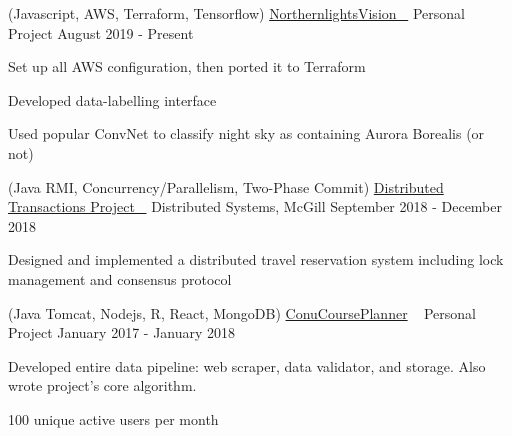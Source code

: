 


\begin{cventries}


\cventry
{(Javascript, AWS, Terraform, Tensorflow)} %
{\href{https://github.com/stumash/northern-lights-vision}{NorthernlightsVision \ \faGithubSquare\acvHeaderIconSep}} %
{Personal Project} %
{August 2019 - Present} %
{ %
\begin{cvitems}
\item {Set up all AWS configuration, then ported it to Terraform}
\item {Developed data-labelling interface}
\item {Used popular ConvNet to classify night sky as containing Aurora Borealis (or not)}
\end{cvitems}
}


\cventry
{(Java RMI, Concurrency/Parallelism, Two-Phase Commit)} %
{\href{https://github.com/stumash/DistributedSystemsProject}{Distributed Transactions Project \ \faGithubSquare\acvHeaderIconSep}} %
{Distributed Systems, McGill} %
{September 2018 - December 2018} %
{ %
\begin{cvitems}
\item {Designed and implemented a distributed travel reservation system including lock management and consensus protocol}
\end{cvitems}
}


\cventry
{(Java Tomcat, Nodejs, R, React, MongoDB)} %
{\href{http://conucourseplanner.online}{ConuCoursePlanner} \ \href{https://github.com/stumash/CoursePlanner}{\faGithubSquare\acvHeaderIconSep}} %
{Personal Project} %
{January 2017 - January 2018} %
{ %
\begin{cvitems}
\item {Developed entire data pipeline: web scraper, data validator, and storage. Also wrote project's core algorithm.}
\item {100 unique active users per month}
\end{cvitems}
}


\end{cventries}
